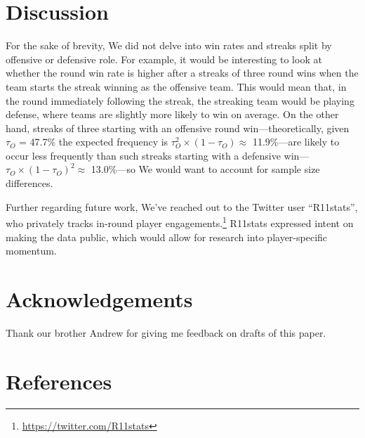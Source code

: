 \documentclass{article}
\begin{document}
\hypertarget{discussion}{%
\section{Discussion}\label{discussion}}

For the sake of brevity, We did not delve into win rates and streaks
split by offensive or defensive role. For example, it would be
interesting to look at whether the round win rate is higher after a
streaks of three round wins when the team starts the streak winning as
the offensive team. This would mean that, in the round immediately
following the streak, the streaking team would be playing defense, where
teams are slightly more likely to win on average. On the other hand,
streaks of three starting with an offensive round win---theoretically,
given \(\tau_O\) = 47.7\% the expected frequency is
\(\tau_O^2 \times (1 - \tau_O) \approx\) 11.9\%---are likely to occur
less frequently than such streaks starting with a defensive
win---\(\tau_O \times (1 - \tau_O)^2 \approx\) 13.0\%---so We would want
to account for sample size differences.

Further regarding future work, We've reached out to the Twitter user
``R11stats'', who privately tracks in-round player
engagements.\footnote{\url{https://twitter.com/R11stats}} R11stats
expressed intent on making the data public, which would allow for
research into player-specific momentum.

\hypertarget{acknowledgements}{%
\section*{Acknowledgements}\label{acknowledgements}}

Thank our brother Andrew for giving me feedback on drafts of this paper.

\hypertarget{references}{%
\section*{References}\label{references}}
\end{document}
